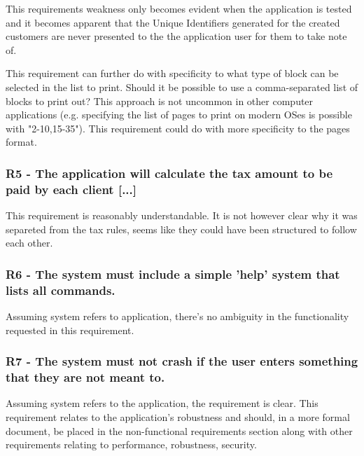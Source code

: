 This requirements weakness only becomes evident when the application is tested and it becomes apparent that the Unique Identifiers generated for the created customers are never presented to the the application user for them to take note of. 

This requirement can further do with specificity to what type of block can be selected in the list to print. 
Should it be possible to use a comma-separated list of blocks to print out? This approach is not uncommon in other computer applications (e.g. specifying the list of pages to print on modern OSes is possible with "2-10,15-35"). This requirement could do with more specificity to the pages format. 

\subsubsection{R5 - The application will calculate the tax amount to be paid by each client [...]} %

This requirement is reasonably understandable. It is not however clear why it was separeted from the tax rules, seems like they could have been structured to follow each other. 

\subsubsection{R6 - The system must include a simple 'help' system that lists all commands.}
Assuming system refers to application, there's no ambiguity in the functionality requested in this requirement. 

\subsubsection{R7 - The system must not crash if the user enters something that they are not meant to.}
Assuming system refers to the application, the requirement is clear. This requirement relates to the application's robustness and should, in a more formal document, be placed in the non-functional requirements section along with other requirements relating to performance, robustness, security. 

